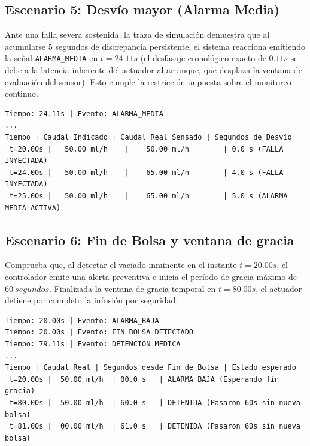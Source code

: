 \subsection{Escenario 5: Desvío mayor (Alarma Media)}
Ante una falla severa sostenida, la traza de simulación demuestra que al acumularse 5 segundos de discrepancia persistente, el sistema reacciona emitiendo la señal \texttt{ALARMA\_MEDIA} en $t=24.11s$ (el desfasaje cronológico exacto de $0.11s$ se debe a la latencia inherente del actuador al arranque, que desplaza la ventana de evaluación del sensor). Esto cumple la restricción impuesta sobre el monitoreo continuo.
\begin{verbatim}
Tiempo: 24.11s | Evento: ALARMA_MEDIA
...
Tiempo | Caudal Indicado | Caudal Real Sensado | Segundos de Desvío
 t=20.00s |   50.00 ml/h    |    50.00 ml/h        | 0.0 s (FALLA INYECTADA)
 t=24.00s |   50.00 ml/h    |    65.00 ml/h        | 4.0 s (FALLA INYECTADA)
 t=25.00s |   50.00 ml/h    |    65.00 ml/h        | 5.0 s (ALARMA MEDIA ACTIVA)
\end{verbatim}

\subsection{Escenario 6: Fin de Bolsa y ventana de gracia}
Comprueba que, al detectar el vaciado inminente en el instante $t=20.00s$, el controlador emite una alerta preventiva e inicia el período de gracia máximo de $60~segundos$. Finalizada la ventana de gracia temporal en $t=80.00s$, el actuador detiene por completo la infusión por seguridad.
\begin{verbatim}
Tiempo: 20.00s | Evento: ALARMA_BAJA
Tiempo: 20.00s | Evento: FIN_BOLSA_DETECTADO
Tiempo: 79.11s | Evento: DETENCION_MEDICA
...
Tiempo | Caudal Real | Segundos desde Fin de Bolsa | Estado esperado
 t=20.00s |  50.00 ml/h  | 00.0 s   | ALARMA BAJA (Esperando fin gracia)
 t=80.00s |  50.00 ml/h  | 60.0 s   | DETENIDA (Pasaron 60s sin nueva bolsa)
 t=81.00s |  00.00 ml/h  | 61.0 s   | DETENIDA (Pasaron 60s sin nueva bolsa)
\end{verbatim}

